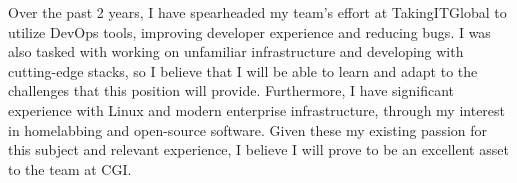 \documentclass[11pt, a4paper]{awesome-cv}
\begin{document}
\begin{cvletter}
Over the past 2 years, I have spearheaded my team's effort at TakingITGlobal to utilize DevOps tools, 
improving developer experience and reducing bugs.
I was also tasked with working on unfamiliar infrastructure and developing with cutting-edge stacks,
so I believe that I will be able to learn and adapt to the challenges that this position will provide.
Furthermore, I have significant experience with Linux and modern enterprise infrastructure,
through my interest in homelabbing and open-source software.
Given these my existing passion for this subject and relevant experience,
I believe I will prove to be an excellent asset to the team at CGI.

\end{cvletter}


\makeletterclosing
\end{document}
